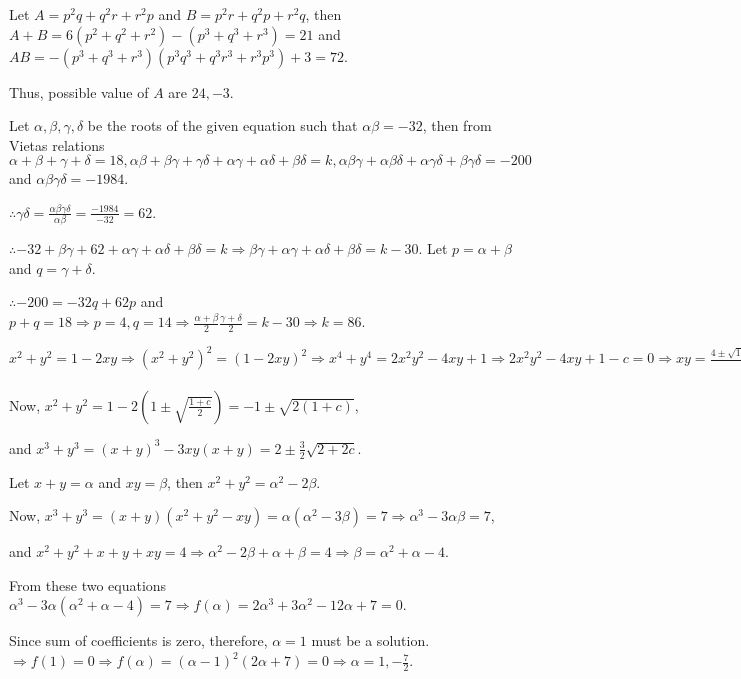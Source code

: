   Let $A = p^2q + q^2r + r^2p$ and $B = p^2r + q^2p + r^2q$, then $A + B = 6(p^2 + q^2 + r^2) - (p^3 + q^3 +
  r^3) = 21$ and $AB = -(p^3 + q^3 + r^3)(p^3q^3 + q^3r^3 + r^3p^3) + 3 = 72$.

  Thus, possible value of $A$ are $24, -3$.
\item Let $\alpha, \beta, \gamma, \delta$ be the roots of the given equation such that $\alpha\beta = -32$,
  then from Vietas relations $\alpha + \beta + \gamma + \delta = 18, \alpha\beta + \beta\gamma +
  \gamma\delta + \alpha\gamma + \alpha\delta + \beta\delta = k, \alpha\beta\gamma + \alpha\beta\delta +
  \alpha\gamma\delta + \beta\gamma\delta = -200$ and $\alpha\beta\gamma\delta = -1984$.

  $\therefore \gamma\delta = \frac{\alpha\beta\gamma\delta}{\alpha\beta} = \frac{-1984}{-32} = 62$.

  $\therefore -32 + \beta\gamma + 62 + \alpha\gamma + \alpha\delta + \beta\delta = k \Rightarrow \beta\gamma
  + \alpha\gamma + \alpha\delta + \beta\delta = k - 30$. Let $p = \alpha + \beta$ and $q = \gamma + \delta$.

  $\therefore -200 = -32q + 62p$ and $p + q = 18 \Rightarrow p = 4, q = 14\Rightarrow \frac{\alpha +
    \beta}{2}\frac{\gamma + \delta}{2} = k - 30 \Rightarrow k = 86$.
\item $x^2 + y^2 = 1 - 2xy \Rightarrow (x^2 + y^2)^2 = (1 - 2xy)^2 \Rightarrow x^4 + y^4 = 2x^2y^2 - 4xy + 1
  \Rightarrow 2x^2y^2 - 4xy + 1 - c = 0 \Rightarrow xy = \frac{4 \pm\sqrt{16 + 8c - 8}}{4} =
  1\pm\sqrt{\frac{1 + c}{2}}$

  Now, $x^2 + y^2 = 1 - 2\left(1\pm\sqrt{\frac{1 + c}{2}}\right) = -1\pm \sqrt{2(1 + c)}$,

  and $x^3 + y^3 = (x + y)^3 - 3xy(x + y) = 2\pm\frac{3}{2}\sqrt{2 + 2c}$.
\item Let $x + y = \alpha$ and $xy = \beta$, then $x^2 + y^2 = \alpha^2 - 2\beta$.

  Now, $x^3 + y^3 = (x + y)(x^2 + y^2 - xy) = \alpha(\alpha^2 - 3\beta) = 7\Rightarrow \alpha^3 -
  3\alpha\beta = 7$,

  and $x^2 + y^2 + x + y + xy = 4 \Rightarrow \alpha^2 - 2\beta + \alpha + \beta = 4 \Rightarrow \beta =
  \alpha^2 + \alpha - 4$.

  From these two equations $\alpha^3 - 3\alpha(\alpha^2 + \alpha - 4) = 7\Rightarrow f(\alpha) = 2\alpha^3 +
  3\alpha^2 - 12\alpha + 7 = 0$.

  Since sum of coefficients is zero, therefore, $\alpha = 1$ must be a solution. $\Rightarrow f(1) = 0
  \Rightarrow f(\alpha) = (\alpha - 1)^2(2\alpha + 7) = 0 \Rightarrow \alpha = 1, -\frac{7}{2}$.

